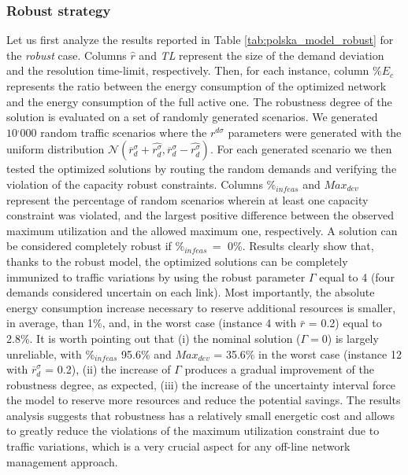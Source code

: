 \documentclass[final,5p,times,twocolumn]{elsarticle}
\begin{document}
\subsubsection{Robust strategy}
Let us first analyze the results reported in Table \ref{tab:polska_model_robust} for the \textit{robust} case. Columns $\hat{r}$ and \textit{TL}  represent the size of the demand deviation and the resolution time-limit, respectively. Then, for each instance, column $\%E_c$ represents the ratio between the energy consumption of the optimized network and the energy consumption of the full active one.
The robustness degree of the solution is evaluated on a set of randomly generated scenarios. We generated $10^,000$ random traffic scenarios where the $r^{d\sigma}$ parameters were generated with the uniform distribution $\mathcal{N}(\overline{r}_d^{\sigma}+\hat{r_d^{\sigma}},\overline{r}_d^{\sigma}-\hat{r_d^{\sigma}})$. For each generated scenario we then tested the optimized solutions by routing the random demands and verifying the violation of the capacity robust constraints. Columns $\%_{infeas}$ and $Max_{dev}$ represent the percentage of random scenarios wherein at least one capacity constraint was violated, and the largest positive difference between the observed maximum utilization and the allowed maximum one, respectively. A solution can be considered completely robust if  $\%_{infeas}\,=$ 0\%. Results clearly show that, thanks to the robust model, the optimized solutions can be completely immunized to traffic variations by using the robust parameter $\Gamma$ equal to 4 (four demands considered uncertain on each link). Most importantly, the absolute  energy consumption increase necessary to reserve additional resources is smaller, in average, than 1\%, and, in the worst case (instance 4 with $\bar{r}$ = 0.2) equal to 2.8\%. It is worth pointing out that (i) the nominal solution ($\Gamma = 0$) is largely unreliable, with $\%_{infeas}$ 95.6\% and $Max_{dev}$ = 35.6\% in the worst case (instance 12 with $\overline{r}_d^{\sigma}$ = 0.2), (ii) the increase of $\Gamma$ produces a gradual improvement of the robustness degree, as expected, (iii) the increase of the uncertainty interval force the model to reserve more resources and reduce the potential savings. The results analysis suggests that robustness has a relatively small energetic cost and allows to greatly reduce the violations of the maximum utilization constraint due to traffic variations, which is a very crucial aspect for any off-line network management approach.
\end{document}
